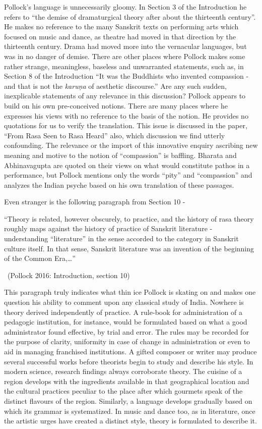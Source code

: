 Pollock’s language is unnecessarily gloomy. In Section 3 of the Introduction he refers to “the demise of dramaturgical theory after about the thirteenth century”. He makes no reference to the many Sanskrit texts on performing arts which focused on music and dance, as theatre had moved in that direction by the thirteenth century. Drama had moved more into the vernacular languages, but was in no danger of demise. There are other places where Pollock makes some rather strange, meaningless, baseless and unwarranted statements, such as, in Section 8 of the Introduction “It was the Buddhists who invented compassion - and that is not the \textit{karuṇa} of aesthetic discourse.” Are any such sudden, inexplicable statements of any relevance in this discussion? Pollock appears to build on his own pre-conceived notions. There are many places where he expresses his views with no reference to the basis of the notion. He provides no quotations for us to verify the translation. This issue is discussed in the paper, “From Rasa Seen to Rasa Heard” also, which discussion we find utterly confounding. The relevance or the import of this innovative enquiry ascribing new meaning and motive to the notion of “compassion” is baffling. Bharata and Abhinavagupta are quoted on their views on what would constitute pathos in a performance, but Pollock mentions only the words “pity” and “compassion” and analyzes the Indian psyche based on his own translation of these passages.

Even stranger is the following paragraph from Section 10 -

\begin{myquote}
“Theory is related, however obscurely, to practice, and the history of rasa theory roughly maps against the history of practice of Sanskrit literature - understanding “literature” in the sense accorded to the category in Sanskrit culture itself. In that sense, Sanskrit literature was an invention of the beginning of the Common Era,…” 

~\hfill (Pollock 2016: Introduction, section 10)
\end{myquote}

This paragraph truly indicates what thin ice Pollock is skating on and makes one question his ability to comment upon any classical study of India. Nowhere is theory derived independently of practice. A rule-book for administration of a pedagogic institution, for instance, would be formulated based on what a good administrator found effective, by trial and error. The rules may be recorded for the purpose of clarity, uniformity in case of change in administration or even to aid in managing franchised institutions. A gifted composer or writer may produce several successful works before theorists begin to study and describe his style. In modern science, research findings always corroborate theory. The cuisine of a region develops with the ingredients available in that geographical location and the cultural practices peculiar to the place after which gourmets speak of the distinct flavours of the region. Similarly, a language develops gradually based on which its grammar is systematized. In music and dance too, as in literature, once the artistic urges have created a distinct style, theory is formulated to describe it.

